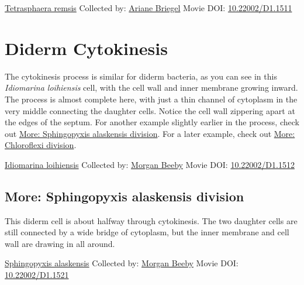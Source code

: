 \documentclass[]{tufte-book}
\begin{document}
\hypertarget{htmlwidget-38addaf155ba95386a32}{}

\label{fig:5-5}\protect\hyperlink{tree}{Tetrasphaera remsis} Collected by: \protect\hyperlink{ariane_briegel}{Ariane Briegel} Movie DOI: \href{https://doi.org/10.22002/D1.1511}{10.22002/D1.1511}

\hypertarget{diderm-cytokinesis}{%
\section{Diderm Cytokinesis}\label{diderm-cytokinesis}}

The cytokinesis process is similar for diderm bacteria, as you can see in this \emph{Idiomarina loihiensis} cell, with the cell wall and inner membrane growing inward. The process is almost complete here, with just a thin channel of cytoplasm in the very middle connecting the daughter cells. Notice the cell wall zippering apart at the edges of the septum. For another example slightly earlier in the process, check out \protect\hyperlink{Sphingopyxis_alaskensis_division}{More: Sphingopyxis alaskensis division}. For a later example, check out \protect\hyperlink{Chloroflexi_division}{More: Chloroflexi division}.



\hypertarget{htmlwidget-646e99e1b8edb3b38f5b}{}

\label{fig:5-6}\protect\hyperlink{tree}{Idiomarina loihiensis} Collected by: \protect\hyperlink{morgan_beeby}{Morgan Beeby} Movie DOI: \href{https://doi.org/10.22002/D1.1512}{10.22002/D1.1512}

\hypertarget{Sphingopyxis_alaskensis_division}{%
\subsection*{More: Sphingopyxis alaskensis division}\label{Sphingopyxis_alaskensis_division}}

This diderm cell is about halfway through cytokinesis. The two daughter cells are still connected by a wide bridge of cytoplasm, but the inner membrane and cell wall are drawing in all around.



\hypertarget{htmlwidget-79894c7d7522f19bf0d7}{}

\label{fig:5-6a}\protect\hyperlink{tree}{Sphingopyxis alaskensis} Collected by: \protect\hyperlink{morgan_beeby}{Morgan Beeby} Movie DOI: \href{https://doi.org/10.22002/D1.1521}{10.22002/D1.1521}
\end{document}
